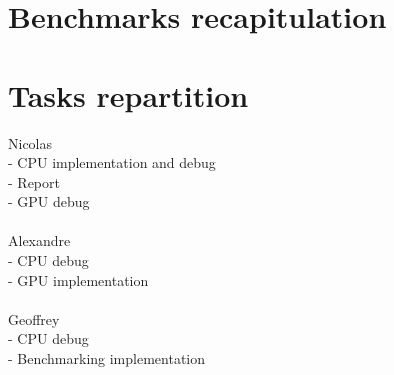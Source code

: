 \documentclass{article}
\begin{document}
\section{Benchmarks recapitulation}

\section{Tasks repartition}

\noindent
Nicolas\\
- CPU implementation and debug\\
- Report\\
- GPU debug\\
\\
Alexandre\\
- CPU debug\\
- GPU implementation\\
\\
Geoffrey\\
- CPU debug\\
- Benchmarking implementation
\end{document}
